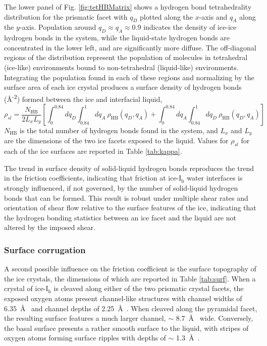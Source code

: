 \documentclass[journal = jpccck, manuscript = article]{achemso}
\begin{document}
The lower panel of Fig. \ref{fig:tetHBMatrix} shows a hydrogen bond
tetrahedrality distribution for the prismatic facet with $q_{D}$
plotted along the $x$-axis and $q_{A}$ along the $y$-axis.  Population
around $q_{D} \approx q_{A} \approx 0.9$ indicates the density of
ice-ice hydrogen bonds in the system, while the liquid-state hydrogen
bonds are concentrated in the lower left, and are significantly more
diffuse.  The off-diagonal regions of the distribution represent the
population of molecules in tetrahedral (ice-like) environments bound
to non-tetrahedral (liquid-like) environments. Integrating the
population found in each of these regions and normalizing by the
surface area of each ice crystal produces a surface density of
hydrogen bonds (\AA\textsuperscript{-2}) formed between the ice and
interfacial liquid,
\begin{equation}\label{hbondDensity}
\rho_{sl} = \frac{N_\mathrm{HB}}{2 L_{x}L_{y}} \left[ \int_0^{0.84}
  dq_{D} \int_{0.84}^1 dq_{A}~\rho_\mathrm{HB}(q_{D},q_{A}) +  \int_0^{0.84}
  dq_{A} \int_{0.84}^1 dq_{D}~\rho_\mathrm{HB}(q_{D},q_{A}) \right]
\end{equation}
$N_\mathrm{HB}$ is the total number of hydrogen bonds found in the
system, and $L_x$ and $L_y$ are the dimensions of the two ice facets
exposed to the liquid.  Values for $\rho_{sl}$ for each of the ice
surfaces are reported in Table \ref{tab:kappa}.

The trend in surface density of solid-liquid hydrogen bonds reproduces
the trend in the friction coefficients, indicating that friction at
ice-I$_\mathrm{h}$ water interfaces is strongly influenced, if not
governed, by the number of solid-liquid hydrogen bonds that can be
formed.  This result is robust under multiple shear rates and
orientation of shear flow relative to the surface features of the ice,
indicating that the hydrogen bonding statistics between an ice facet
and the liquid are not altered by the imposed shear.

\subsubsection{Surface corrugation}
A second possible influence on the friction coefficient is the surface
topography of the ice crystals, the dimensions of which are reported
in Table \ref{tab:surf}. When a crystal of ice-I$_\mathrm{h}$ is
cleaved along either of the two prismatic crystal facets, the exposed
oxygen atoms present channel-like structures with channel widths of
6.35~\AA~ and channel depths of 2.25~\AA~.  When cleaved along the
pyramidal facet, the resulting surface features a much larger channel,
$\sim$ 8.7~\AA~ wide.  Conversely, the basal surface presents a
rather smooth surface to the liquid, with stripes of oxygen atoms
forming surface ripples with depths of $\sim$ 1.3~\AA~.
\end{document}
